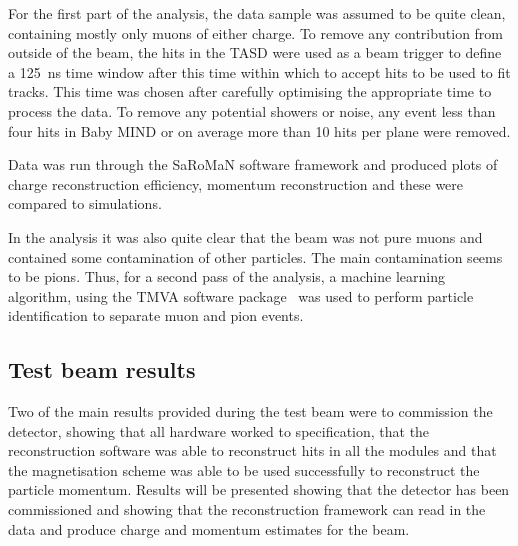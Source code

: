 For the first part of the analysis, the data sample was assumed to be quite clean, containing mostly only muons of either charge. To remove any contribution from outside of the beam, the hits in the TASD were used as a beam trigger to define a 125~ns time window after this time within which to accept hits to be used to fit tracks. This time was chosen after carefully optimising the appropriate time to process the data. To remove any potential showers or noise, any event less than four hits in Baby MIND or on average more than 10 hits per plane were removed.

Data was run through the SaRoMaN software framework and produced plots of charge reconstruction efficiency, momentum reconstruction and these were compared to simulations.

In the analysis it was also quite clear that the beam was not pure muons and contained some contamination of other particles. The main contamination seems to be pions. Thus, for a second pass of the analysis, a machine learning algorithm, using the TMVA software package~\cite{TMVA} was used to perform particle identification to separate muon and pion events.









\subsection{Test beam results}
Two of the main results provided during the test beam were to commission the detector, showing that all hardware worked to specification, that the reconstruction software was able to reconstruct hits in all the modules and that the magnetisation scheme was able to be used successfully to reconstruct the particle momentum. Results will be presented showing that the detector has been commissioned and showing that the reconstruction framework can read in the data and produce charge and momentum estimates for the beam.


